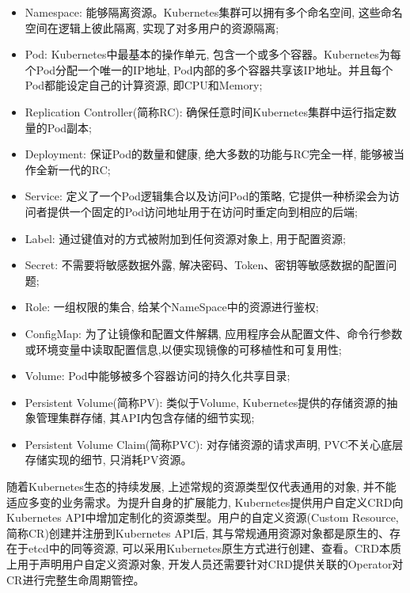 \begin{itemize}[itemindent=2em]
    \item Namespace: 能够隔离资源。Kubernetes集群可以拥有多个命名空间, 这些命名空间在逻辑上彼此隔离, 实现了对多用户的资源隔离;

    \item Pod: Kubernetes中最基本的操作单元, 包含一个或多个容器。Kubernetes为每个Pod分配一个唯一的IP地址, Pod内部的多个容器共享该IP地址。并且每个Pod都能设定自己的计算资源, 即CPU和Memory;

    \item Replication Controller(简称RC): 确保任意时间Kubernetes集群中运行指定数量的Pod副本;

    \item Deployment: 保证Pod的数量和健康, 绝大多数的功能与RC完全一样, 能够被当作全新一代的RC;

    \item Service: 定义了一个Pod逻辑集合以及访问Pod的策略, 它提供一种桥梁会为访问者提供一个固定的Pod访问地址用于在访问时重定向到相应的后端;

    \item Label: 通过键值对的方式被附加到任何资源对象上, 用于配置资源;

    \item Secret: 不需要将敏感数据外露, 解决密码、Token、密钥等敏感数据的配置问题;

    \item Role: 一组权限的集合, 给某个NameSpace中的资源进行鉴权;

    \item ConfigMap: 为了让镜像和配置文件解耦, 应用程序会从配置文件、命令行参数或环境变量中读取配置信息,以便实现镜像的可移植性和可复用性;

    \item Volume: Pod中能够被多个容器访问的持久化共享目录;

    \item Persistent Volume(简称PV): 类似于Volume, Kubernetes提供的存储资源的抽象管理集群存储, 其API内包含存储的细节实现;

    \item Persistent Volume Claim(简称PVC): 对存储资源的请求声明, PVC不关心底层存储实现的细节, 只消耗PV资源。

\end{itemize}

随着Kubernetes生态的持续发展, 上述常规的资源类型仅代表通用的对象, 并不能适应多变的业务需求。为提升自身的扩展能力, Kubernetes提供用户自定义CRD向Kubernetes API中增加定制化的资源类型。用户的自定义资源(Custom Resource, 简称CR)创建并注册到Kubernetes API后, 其与常规通用资源对象都是原生的、存在于etcd中的同等资源, 可以采用Kubernetes原生方式进行创建、查看。CRD本质上用于声明用户自定义资源对象, 开发人员还需要针对CRD提供关联的Operator对CR进行完整生命周期管控。

